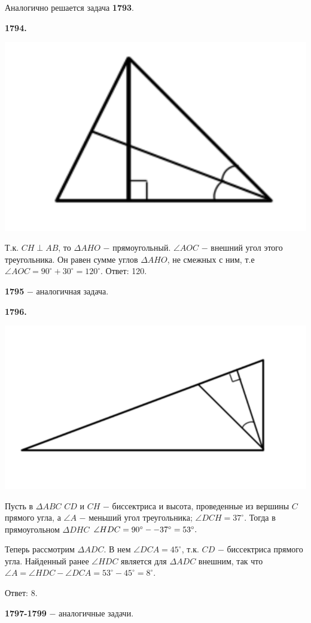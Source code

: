 Аналогично решается задача \textbf{1793}.

\textbf{1794.}

{\centering \includegraphics[width=0.4\linewidth]{Geometry/Content/11.png}
	
}

Т.к. $CH \perp AB$, то $\Delta AHO$ $-$ прямоугольный. $\angle AOC$ $-$ внешний угол этого треугольника. Он равен сумме углов $\Delta AHO$, не смежных с ним, т.е
$\angle AOC = 90^\circ + 30^\circ = 120^\circ$. \newline \null \hspace*{\fill} Ответ: 120.

\textbf{1795} $-$ аналогичная задача.

\clearpage 

\textbf{1796.}

{\centering \includegraphics[width=0.5\linewidth]{Geometry/Content/12.png}
	
}

Пусть в $\Delta ABC$ $CD$ и $CH$ $-$ биссектриса и высота, проведенные из вершины $C$ прямого угла, а $\angle A$ $-$ меньший угол треугольника; $\angle DCH = 37^\circ$. Тогда в прямоугольном $\Delta DHC$ $\angle HDC = 90^\circ -\linebreak - 37^\circ = 53^\circ.$

Теперь рассмотрим $\Delta ADC$. В нем $\angle DCA = 45^\circ$, т.к. $CD$ $-$ биссектриса прямого угла. Найденный ранее $\angle HDC$ является для $\Delta ADC$ внешним, так что $\angle A = \angle HDC - \angle DCA  = 53^\circ - 45^\circ = 8^\circ.$ 

\null \hspace*{\fill} Ответ: 8.

\textbf{1797-1799} $-$ аналогичные задачи.

